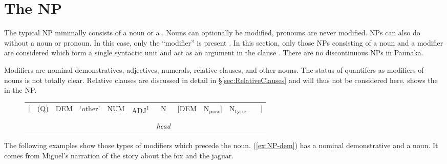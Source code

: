 {%




\section{The NP}\label{sec:NP}

The typical NP minimally consists of a noun or a . Nouns can optionally be modified, pronouns are never modified. NPs can also do without a noun or pronoun. In this case, only the “modifier” is present \citep[cf.][]{Dryer2004}. In this section, only those NPs consisting of a noun and a modifier are considered which form a single syntactic unit and act as an argument in the clause \citep[cf.][13]{Krasnoukhova2012}. There are no discontinuous NPs in Paunaka.

Modifiers are nominal demonstratives, adjectives, numerals, relative clauses, and other nouns. The status of quantifers as modifiers of nouns is not totally clear. Relative clauses are discussed in detail in §\ref{sec:RelativeClauses} and will thus not be considered here.  shows the  in the NP.


\begin{figure}
\begin{tabularx}{\textwidth}{rQCCCCCCCCQl}
{${\Biggl [}$} & {(Q)} & {DEM} & {‘other’} & {NUM} & {ADJ\textsuperscript{1}} & {N} & [{DEM}  & {N\textsubscript{poss}}] & {N\textsubscript{type}} & {} & {${\Biggl ]}$}\\
 & & &  & & & & & & &  &\\
& & & & & & \textit{head} & & & & & \\
\end{tabularx}
\label{fig:NP}
\end{figure}



The following examples show those types of modifiers which precede the noun. (\ref{ex:NP-dem}) has a nominal demonstrative and a noun. It comes from Miguel’s narration of the story about the fox and the jaguar.

}
